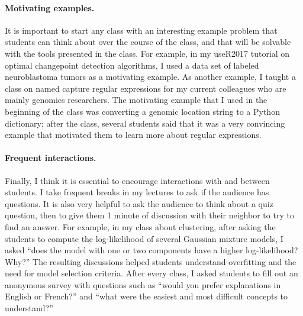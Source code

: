 \documentclass{article}
\begin{document}
\paragraph{Motivating examples.} It is important to start any class
with an interesting example problem that students can think about over
the course of the class, and that will be solvable with the tools
presented in the class. For example, in my useR2017 tutorial on
optimal changepoint detection algorithms, I used a data set of labeled
neuroblastoma tumors as a motivating example. As another example, I
taught a class on named capture regular expressions for my current
colleagues who are mainly genomics researchers. The motivating example
that I used in the beginning of the class was converting a genomic
location string to a Python dictionary; after the class, several
students said that it was a very convincing example that motivated
them to learn more about regular expressions.

\paragraph{Frequent interactions.} Finally, I think it is essential to
encourage interactions with and between students. I take frequent
breaks in my lectures to ask if the audience has questions. It is also
very helpful to ask the audience to think about a quiz question, then
to give them 1 minute of discussion with their neighbor to try to find
an answer. For example, in my class about clustering, after asking the
students to compute the log-likelihood of several Gaussian mixture
models, I asked ``does the model with one or two components have a higher
log-likelihood? Why?'' The resulting discussions helped students
understand overfitting and the need for model selection
criteria. After every class, I asked students to fill out an anonymous
survey with questions such as ``would you prefer explanations in
English or French?'' and ``what were the easiest and most difficult
concepts to understand?''
\end{document}
